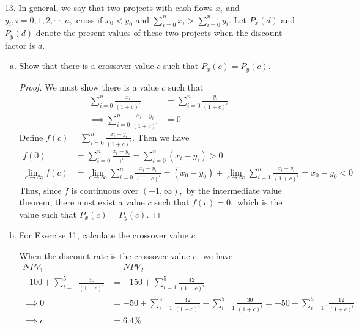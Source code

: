 \documentclass{article}
\begin{document}
\begin{itemize}
	\item[13.] In general, we say that two projects with cash flows $x_i$ and $y_i, i=0, 1, 2, \cdots, n,$ cross if $x_0<y_0$ and $\sum_{i=0}^{n} x_i>\sum_{i=0}^{n} y_i.$ Let $P_x(d)$ and $P_y(d)$ denote the present values of these two projects when the discount factor is $d.$
		\begin{enumerate}[(a)]
			\item Show that there is a crossover value $c$ such that $P_x(c)=P_y(c).$
				\begin{proof}
					We must show there is a value $c$ such that
					\begin{align*}
						\sum_{i=0}^{n} \frac{x_i}{(1+c)^i} &= \sum_{i=0}^{n} \frac{y_i}{(1+c)^i} \\
						\implies \sum_{i=0}^{n} \frac{x_i-y_i}{(1+c)^i} &= 0	
					\end{align*}
					Define $f(c)=\sum_{i=0}^{n} \frac{x_i-y_i}{(1+c)^i}.$ Then we have
					\begin{align*}
						f(0) &= \sum_{i=0}^{n} \frac{x_i-y_i}{1^i} = \sum_{i=0}^{n} (x_i-y_i)>0 \\
						\lim_{c\to\infty} f(c) &= \lim_{c\to\infty}\sum_{i=0}^{n} \frac{x_i-y_i}{(1+c)^i} = (x_0-y_0) + \lim_{c\to\infty}\sum_{i=1}^{n} \frac{x_i-y_i}{(1+c)^i} = x_0-y_0 < 0
					\end{align*}
					Thus, since $f$ is continuous over $(-1, \infty),$ by the intermediate value theorem, there must exist a value $c$ such that $f(c)=0,$ which is the value such that $P_x(c)=P_y(c).$
				\end{proof}

			\item For Exercise 11, calculate the crossover value $c.$
				\begin{soln}
					When the discount rate is the crossover value $c,$ we have
					\begin{align*}
						NPV_1 &= NPV_2 \\
						-100+\sum_{i=1}^{5}\frac{30}{(1+c)^i} &= -150 + \sum_{i=1}^{5}\frac{42}{(1+c)^i} \\
						\implies 0 &= -50+\sum_{i=1}^{5}\frac{42}{(1+c)^i} - \sum_{i=1}^{5}\frac{30}{(1+c)^i} = -50+\sum_{i=1}^{5}.\frac{12}{(1+c)^i} \\
						\implies c &= 6.4\%
					\end{align*}
				\end{soln}
				
		\end{enumerate}

\end{itemize}
\end{document}
